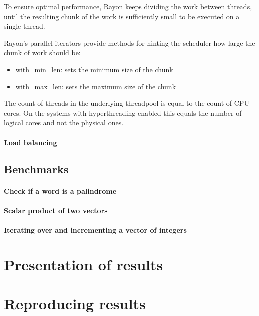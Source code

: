 To ensure optimal performance, Rayon keeps dividing the work between threads, until the resulting chunk of the work is sufficiently small to be executed on a single thread. 

Rayon's parallel iterators provide methods for hinting the scheduler how large the chunk of work should be: 
\begin{itemize}
    \item with\_min\_len: sets the minimum size of the chunk
    \item with\_max\_len: sets the maximum size of the chunk
\end{itemize}


The count of threads in the underlying threadpool is equal to the count of CPU cores. On the systems with hyperthreading enabled this equals the number of logical cores and not the physical ones. 

\paragraph*{Load balancing}

\subsection{Benchmarks}

\paragraph*{Check if a word is a palindrome}

\paragraph*{Scalar product of two vectors}

\paragraph*{Iterating over and incrementing a vector of integers}

\section{Presentation of results}

\section{Reproducing results}
